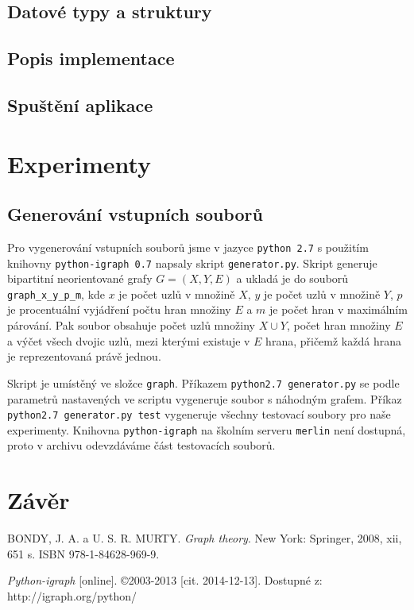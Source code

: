 \documentclass[a4paper, 11pt, titlepage, final]{article}[3. prosinec 2011]
\begin{document}
\subsection{Datové typy a struktury}

\subsection{Popis implementace}

\subsection{Spuštění aplikace}

\section{Experimenty}

\subsection{Generování vstupních souborů}

Pro vygenerování vstupních souborů jsme v jazyce \texttt{python 2.7} s použitím knihovny \texttt{python-igraph 0.7} napsaly skript \texttt{generator.py}. 
Skript generuje bipartitní neorientované grafy $G=(X,Y,E)$ a ukladá je do souborů \texttt{graph\_x\_y\_p\_m}, kde $x$ je počet uzlů v množině $X$, $y$ je počet uzlů v množině $Y$, $p$ je procentuální vyjádření počtu hran množiny $E$ a $m$ je počet hran v maximálním párování. Pak soubor obsahuje počet uzlů množiny $X \cup Y$, počet hran množiny $E$ a výčet všech dvojic uzlů, mezi kterými existuje v $E$ hrana, přičemž každá hrana je reprezentovaná právě jednou.

Skript je umístěný ve složce \texttt{graph}. Příkazem \texttt{python2.7 generator.py} se podle parametrů nastavených ve scriptu vygeneruje soubor s náhodným grafem. Příkaz \texttt{python2.7 generator.py test} vygeneruje všechny testovací soubory pro naše experimenty. Knihovna \texttt{python-igraph} na školním serveru \texttt{merlin} není dostupná, proto v archivu odevzdáváme část testovacích souborů.



\section{Závěr}

\begin{thebibliography}{1}
  
   BONDY, J. A. a U. S. R. MURTY. \emph{Graph theory}. New York: Springer, 2008, xii, 651 s. ISBN 978-1-84628-969-9. 
  
   \emph{Python-igraph} [online]. \copyright 2003-2013 [cit. 2014-12-13]. Dostupné z: http://igraph.org/python/ 

\end{thebibliography}


\end{document}
